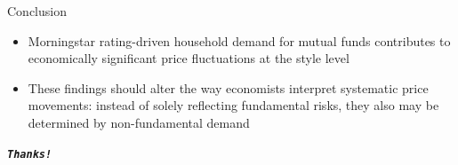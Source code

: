 \documentclass[UTF8, 16pt]{beamer}
\begin{document}
\begin{CJK*}{UTF8}{gbsn}
\begin{frame}{Conclusion}
	\begin{itemize}
		\item Morningstar rating-driven household demand for mutual funds contributes to economically significant price fluctuations at the style level
		\item These findings should alter the way economists interpret systematic price movements: instead of solely reflecting fundamental risks, they also may be determined by \alert{non-fundamental demand}
	\end{itemize}
\end{frame}


\begin{frame}[allowframebreaks]%
	\begin{center}
		\Huge\textbf{\textit{\texttt{Thanks!}}}
	\end{center}
\end{frame}




\end{CJK*}
\end{document}
